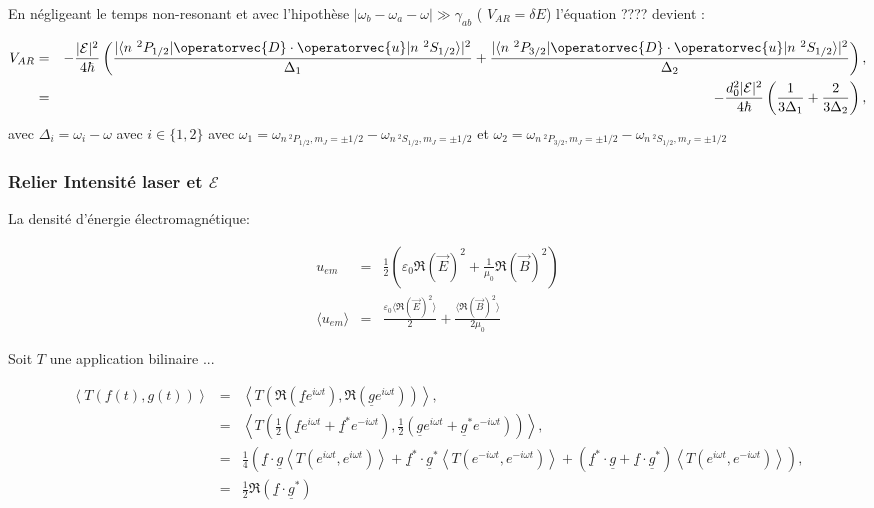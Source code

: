 En négligeant le temps non-resonant et avec l'hipothèse $\vert \omega_b - \omega_a -\omega  \vert \gg \gamma_{ab} $ ( $V_{AR} = \delta E$) l'équation ???? devient :

\begin{eqnarray*}
	V_{AR} & = & - \frac{ \vert \mathcal{E} \vert^2}{4 \hbar} \left( \frac{ \vert \langle n {~}^2P_{1/2}  \vert \operatorvec{D} \cdot \operatorvec{u}\vert n {~}^2S_{1/2}  \rangle \vert^2}{ \Delta_1} + \frac{ \vert\langle n {~}^2P_{3/2}  \vert \operatorvec{D} \cdot \operatorvec{u}\vert n {~}^2S_{1/2}  \rangle \vert^2}{ \Delta_2}  \right ) , \\
	&  = &  - \frac{  d_0^2 \vert \mathcal{E} \vert^2 }{4 \hbar} \left( \frac{ 1}{ 3 \Delta_1} + \frac{2 }{ 3 \Delta_2}  \right ) ,		
\end{eqnarray*}
avec $\Delta_i = \omega_i - \omega $ avec $ i \in \{ 1 , 2 \}$ avec $\omega_1 = \omega_{n {~}^2P_{1/2}, m_J = \pm  1/2}- \omega_{n {~}^2S_{1/2}, m_J = \pm  1/2}$ et $\omega_2 = \omega_{n {~}^2P_{3/2}, m_J = \pm  1/2} - \omega_{n {~}^2S_{1/2}, m_J = \pm  1/2}$

\subsubsection{Relier Intensité laser et $\mathcal{E}$}

La densité d'énergie électromagnétique:

\begin{eqnarray}
	u_{em} & = &  \frac{1}2 \left ( \varepsilon_0  \Re ( \vec{E} ) ^2 + \frac{1}{\mu_0} \Re(\vec{B})^2 \right ) \\
	\langle u_{em} \rangle & =& \frac{\varepsilon_0 \langle \Re(\vec{E})^2 \rangle}{2} + \frac{\langle \Re(\vec{B})^2 \rangle }{2 \mu_0} 
\end{eqnarray}



Soit $ T$ une application bilinaire ...

\begin{eqnarray}
	\left \langle T \left (  f(t),  g(t) \right ) \right \rangle & = & \left \langle T \left ( \Re \left  ( \underline{f} e^{i \omega t } \right ),  \Re \left ( \underline{g} e^{i \omega t } \right ) \right ) \right \rangle , \\
		& = &  \left \langle T \left ( \frac{1}{2} ( \underline{f} e^{i \omega t } + \underline{f}^\ast e^{-i \omega t } ) ,  \frac{1}{2} ( \underline{g} e^{i \omega t } + \underline{g}^\ast  e^{-i \omega t }  ) \right ) \right \rangle,\\
	&  = & \frac{1}{4} \left (\underline{f} \cdot \underline{g} \left \langle T \left ( e^{i \omega t } , e^{i \omega t }\right ) \right \rangle  + \underline{f}^\ast  \cdot \underline{g}^\ast  \left \langle T \left ( e^{-i \omega t } , e^{-i \omega t }\right ) \right \rangle + ( \underline{f}^\ast  \cdot \underline{g} + \underline{f}  \cdot \underline{g}^\ast)\left \langle T \left ( e^{i \omega t } , e^{-i \omega t }\right ) \right \rangle   \right ),\\
	& = & \frac{1}{2} \Re (\underline{f}  \cdot \underline{g}^\ast  )   
\end{eqnarray}


